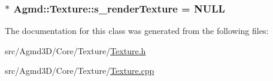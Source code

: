 \hypertarget{class_agmd_1_1_texture_a51dca7410fffcf8b9f78631b9bc4b3da}{
\subsubsection[{s\+\_\+render\+Texture}]{ $\ast$ Agmd\+::\+Texture\+::s\+\_\+render\+Texture = N\+U\+L\+L\hspace{0.3cm}{\ttfamily [static]}}}\label{class_agmd_1_1_texture_a51dca7410fffcf8b9f78631b9bc4b3da}


The documentation for this class was generated from the following files\+:\begin{DoxyCompactItemize}
\item 
src/\+Agmd3\+D/\+Core/\+Texture/\hyperlink{_texture_8h}{Texture.\+h}\item 
src/\+Agmd3\+D/\+Core/\+Texture/\hyperlink{_texture_8cpp}{Texture.\+cpp}\end{DoxyCompactItemize}
